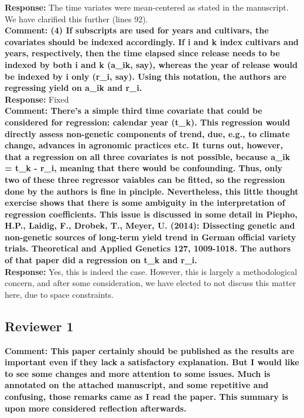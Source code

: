 \documentclass{article} \usepackage[margin=1in]{geometry}
\begin{document}
\textbf{Response:} The time variates were mean-centered as stated in
the manuscript. We have clarified this further (lines 92).\\

\textbf{Comment: (4) If subscripts are used for years and cultivars,
  the covariates should be indexed accordingly. If i and k index
  cultivars and years, respectively, then the time elapsed since
  release needs to be indexed by both i and k (a\_ik, say), whereas
  the year of release would be indexed by i only (r\_i, say). Using
  this notation, the authors are regressing yield on a\_ik and
  r\_i.}\\

\textbf{Response:} Fixed\\

\textbf{Comment: There's a simple third time covariate that could be
  considered for regression: calendar year (t\_k). This regression
  would directly assess non-genetic components of trend, due, e.g., to
  climate change, advances in agronomic practices etc. It turns out,
  however, that a regression on all three covariates is not possible,
  because a\_ik = t\_k - r\_i, meaning that there would be
  confounding. Thus, only two of these three regressor vaiables can be
  fitted, so the regression done by the authors is fine in pinciple.
  Nevertheless, this little thought exercise shows that there is some
  ambiguity in the interpretation of regression coefficients. This
  issue is discussed in some detail in Piepho, H.P., Laidig, F.,
  Drobek, T., Meyer, U. (2014): Dissecting genetic and non-genetic
  sources of long-term yield trend in German official variety
  trials. Theoretical and Applied Genetics 127, 1009-1018. The authors
  of that paper did a regression on t\_k and r\_i.}\\

\textbf{Response:} Yes, this is indeed the case. However, this is
largely a methodological concern, and after some consideration, we
have elected to not discuss this matter here, due to space
constraints.\\

\subsection{Reviewer 1}

\textbf{Comment: This paper certainly should be published as the
  results are important even if they lack a satisfactory
  explanation. But I would like to see some changes and more attention
  to some issues. Much is annotated on the attached manuscript, and
  some repetitive and confusing, those remarks came as I read the
  paper. This summary is upon more considered reflection afterwards.}
\end{document}
